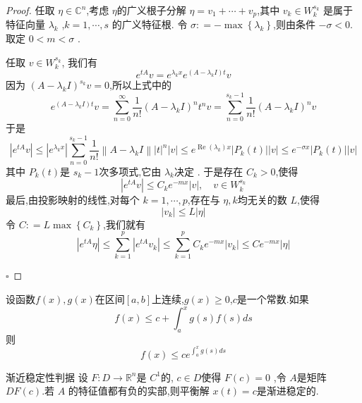 \documentclass[lang=cn,12pt,color=green,fontset=none]{elegantbook}
\begin{document}
\begin{proof}
    任取 $ \eta  \in \mathbb{C}^{n} $,考虑 $ \eta  $的广义根子分解 $ \eta  =v_1+ \cdots + v_{p} $,其中 $ v_{k} \in W_{k}^{s_{k}} $ 是属于特征向量 $  \lambda _{k} $ ,$ k= 1,\cdots,s  $ 的广义特征根.
    令 $ \sigma  : =- \max \left\{  \lambda _{k} \right\} $,则由条件 $ -\sigma <0 $.取定 $ 0<m<\sigma  $   .
    
    
    任取 $ v \in W_{k}^{s_{k}} $, 我们有 $$
   e^{tA}v= e^{ \lambda _{k}x} e^{\left( A -  \lambda _{k}I \right) t}v
    $$因为 $ \left( A- \lambda _{k}I \right)^{s_{k}}v =0  $,所以上式中的 $$
    e^{\left( A- \lambda _{k}I \right)t }v = \sum _{n =0}^{\infty} \frac{1}{n!}  \left( A- \lambda _{k}I \right)^{n}t ^{ n}v=\sum _{n = 0}^{s_{k}-1} \frac{1}{n!} \left( A- \lambda _{k}I \right)^{n}v  
    $$ 于是 $$
    \left| e^{tA}v \right| \le  \left| e^{ \lambda _{k}x} \right|  \sum _{n =0}^{s_{k}-1} \frac{1}{n!}\left\| A- \lambda _{k}I \right\| \left| t \right|^{n}\left| v \right|\le e^{\operatorname{Re}\left(  \lambda _{k} \right)x } \left| P_{k}\left( t \right)  \right|\left| v \right|    \le  e^{-\sigma x}\left| P_{k}\left( t \right)  \right|\left| v \right|  
    $$其中 $ P_{k}\left( t \right)  $是 $ s_{k}-1 $次多项式,它由 $  \lambda _{k} $决定 .  于是存在 $ C_{k}>0  $,使得 $$
    \left| e^{tA}v \right| \le  C _{k}e^{-mx}\left| v \right|,\quad  v \in W_{k}^{s_{k}}  
    $$ 
    最后,由投影映射的线性,对每个 $ k= 1,\cdots,p  $,存在与 $ \eta , k $均无关的数 $ L $,使得 $$
    \left| v _{k}\right| \le  L\left| \eta  \right|  
    $$  令 $ C: = L \max \left\{ C_{k} \right\} $,我们就有 $$
    \left| e^{tA} \eta  \right|\le  \sum _{k=1}^{p} \left| e^{tA}v_{k} \right|\le \sum _{k=1}^{p}C_{k}e^{-mx}\left| v_{k} \right|\le Ce^{-mx}\left| \eta  \right|    
    $$ 

    \hfill $\square$
\end{proof}
\begin{lemma}
    设函数$f\left( x \right),g\left( x \right)$在区间$[a,b]$上连续,$g\left( x \right)\geqslant 0$,$c$是一个常数.如果 $$ f\left( x \right) \leqslant  c+ \int _{a}^{x}g\left( s  \right) f\left( s \right) ds $$则 $$ f\left( x \right) \leqslant  ce^{ \int _{a}^{x}g\left( s \right) ds} $$
\end{lemma}
\begin{proposition}{渐近稳定性判据}
    设 $ F: D\to \mathbb{R} ^{n} $是 $ C^{1} $的, $ c \in D $使得 $ F\left( c \right)=0  $   ,令 $ A $是矩阵 $ DF\left( c \right)  $.若 $ A $ 的特征值都有负的实部,则平衡解 $ x\left( t \right)=c  $是渐进稳定的.    
\end{proposition}
\end{document}
